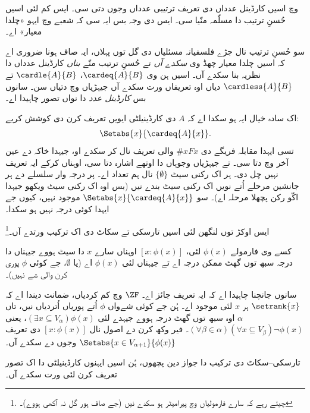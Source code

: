 \documentclass[../../../include/open-logic-section]{subfiles}
\begin{document}

 وچ اسیں کارڈینل عدداں دی تعریف ترتیبی عدداں وجوں دتی سی۔ ایس کم لئی اسیں حُسنِ ترتیب دا مسلّمہ منّیا سی۔ ایس دی وجہ بس ایہ سی کہ شعبے وچ ایہو «چلدا معیار» اے۔

سو حُسنِ ترتیب نال جڑے فلسفیانہ مسئلیاں دی گل توں پہلاں، ایہ صاف ہونا ضروری اے کہ اسیں چلدا معیار چھڈ وی \emph{سکدے آں} تے حُسنِ ترتیب منّے \emph{بناں} کارڈینل عدداں دا نظریہ بنا سکدے آں۔ اسیں ہن وی $\cardeq{A}{B}$، $\cardle{A}{B}$ تے $\cardless{A}{B}$ دیاں اوہ تعریفاں ورت سکدے آں جیہڑیاں  وچ دتیاں سن۔ سانوں بس \emph{کارڈینل عدد} دا نواں تصور چاہیدا اے۔

اک سادہ خیال ایہ ہو سکدا اے کہ $A$ دی کارڈینیلٹی ایویں تعریف کرن دی کوشش کریے:
\[
	\Setabs{x}{\cardeq{A}{x}}.
\]
تسی ایہدا مقابلہ فریگے دی $\# x Fx$ والی تعریف نال کر سکدے او، جیہدا خاکہ  دے عین آخر وچ دتا سی۔ تے جیہڑیاں وجوہاں دا اوتھے اشارہ دتا سی، اوہناں کرکے ایہ تعریف نہیں چل دی۔ ہر اک رکنی سیٹ $\{\emptyset\}$ نال ہم تعداد اے۔ پر درجہ وار سلسلے دے ہر جانشین مرحلے اُتے نویں اک رکنی سیٹ بندے نیں (بس اوہ اک رکنی سیٹ ویکھو جیہدا اکّو رکن پچھلا مرحلہ اے)۔ سو $\Setabs{x}{\cardeq{A}{x}}$ موجود نہیں، کیوں جے ایہدا کوئی درجہ نہیں ہو سکدا۔

ایس اوکڑ توں لنگھن لئی اسیں تارسکی تے سکاٹ دی اک ترکیب ورتدے آں۔\footnote{چیتے رہے کہ سارے فارمولیاں وچ پیرامیٹر ہو سکدے نیں (جے صاف ہور گل نہ آکھی ہووے)۔}

\begin{defn}
کسے وی فارمولے $\phi(x)$ لئی، $[ x : \phi(x)] $ اوہناں سارے $x$ دا سیٹ ہووے جیہناں دا درجہ سبھ توں گھٹ ممکن درجہ اے تے جیہناں لئی $\phi(x)$ اے (یا $\emptyset$، جے کوئی $\phi$ پوری کرن والی شے نہیں)۔
\end{defn}

سانوں جانچنا چاہیدا اے کہ ایہ تعریف جائز اے۔ $\ZF$ وچ کم کردیاں،  ضمانت دیندا اے کہ $\setrank{x}$ ہر $x$ لئی موجود اے۔ ہُن جے کوئی شےواں $\phi$ اُتے پوریاں اُتردیاں نیں، تاں $\alpha$ اوہ سبھ توں گھٹ درجہ ہووے جیہدے لئی $(\exists x\subseteq V_\alpha)\phi(x)$، یعنی $(\forall \beta
\in \alpha)(\forall x \subseteq V_\beta)\lnot \phi(x)$۔ فیر وکھ کرن دے اصول نال $[x : \phi(x)]$ دی تعریف $\Setabs{x \in
V_{\alpha+1}}{\phi(x)}$ وجوں دے سکدے آں۔

تارسکی–سکاٹ دی ترکیب دا جواز دین پچھوں، ہُن اسیں ایہنوں کارڈینیلٹی دا اک تصور تعریف کرن لئی ورت سکدے آں۔
\end{document}
